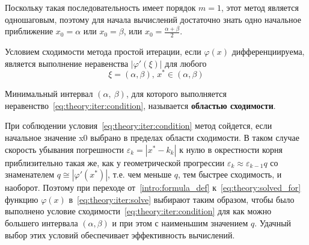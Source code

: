 Поскольку такая последовательность имеет порядок $m=1$, этот метод является одношаговым, поэтому для начала вычислений достаточно знать одно начальное приближение $x_0 = \alpha$ или $x_0 = \beta$, или $x_0=\frac{\alpha + \beta}{2}$.

Условием сходимости метода простой итерации, если $\varphi(x)$ дифференциируема, является выполнение неравенства $\left|\varphi'(\xi)\right|$ для любого 
\begin{equation}
	\label{eq:theory:iter:condition}
	\xi = (\alpha, \beta),\, x^*\in(\alpha, \beta)
\end{equation}

Минимальный интервал $(\alpha,\ \beta)$, для которого выполняется неравенство~\ref{eq:theory:iter:condition}, называется \textbf{областью сходимости}.

При соблюдении условия~\ref{eq:theory:iter:condition} метод сойдется, если начальное значение x0 выбрано в пределах области сходимости. В таком случае скорость убывания погрешности $\varepsilon_k = \left|x^* - k_k \right|$ к нулю в окрестности корня приблизительно такая же, как у геометрической прогрессии $\varepsilon_k\approx \varepsilon_{k-1}q$ со знаменателем $q\cong \left|\varphi'(x^*)\right|$, т.е. чем меньше $q$, тем быстрее сходимость, и наоборот.
Поэтому при переходе от~\ref{intro:formula_def} к~\ref{eq:theory:solved_for} функцию $\varphi(x)$ в~\ref{eq:theory:iter:solve} выбирают таким образом, чтобы было выполнено условие сходимости~\ref{eq:theory:iter:condition} для как можно большего интервала $(\alpha, \beta)$ и при этом с наименьшим значением $q$. Удачный выбор этих условий обеспечивает эффективность вычислений.

